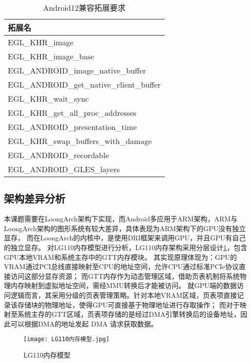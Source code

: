 \begin{table}[h]
  \centering
  \caption{Android12兼容拓展要求}
  \label{tab:Android12兼容拓展要求}
  \begin{tabular}{l}
    \toprule
    拓展名  \\
    \midrule
    EGL\_KHR\_image \\
    EGL\_KHR\_image\_base \\
    EGL\_ANDROID\_image\_native\_buffer \\
    EGL\_ANDROID\_get\_native\_client\_buffer \\
    EGL\_KHR\_wait\_sync \\
    EGL\_KHR\_get\_all\_proc\_addresses \\
    EGL\_ANDROID\_presentation\_time \\
    EGL\_KHR\_swap\_buffers\_with\_damage \\
    EGL\_ANDROID\_recordable \\
    EGL\_ANDROID\_GLES\_layers \\
    \bottomrule
  \end{tabular}
  \note{}
\end{table}

\subsection{架构差异分析}
\label{sec:架构差异分析}
本课题需要在LoongArch架构下实现，而Android多应用于ARM架构，ARM与LoongArch架构的图形系统有较大差异，具体表现为ARM架构下的GPU没有独立显存\cite{Inki}，
而在LoongArch的内核中，是使用DRI框架来调用GPU，并且GPU有自己的独立显存。
对LG110内存模型进行分析，LG110内存架构采用分层设计\ref{fig:LG110内存模型}，包含GPU本地VRAM和系统主存中的GTT内存模块。
其实现原理体现为：GPU的VRAM通过PCI总线直接映射至CPU的地址空间，允许CPU通过标准PCIe协议直接访问这部分显存资源；
而GTT内存作为动态管理区域，借助页表机制将系统物理内存映射到虚拟地址空间，需经MMU转换后才能被访问。
就GPU端的数据访问逻辑而言，其采用分级的页表管理策略。针对本地VRAM区域，页表项直接记录该存储块的物理地址，使得GPU可直接基于物理地址进行存取操作；
而对于映射至系统主存的GTT区域，页表项存储的是经过DMA引擎转换后的设备地址，因此可以根据DMA的地址发起 DMA 请求获取数据。

\begin{figure}
  \centering
  \texttt{[image: LG110内存模型.jpg]}
  \caption{LG110内存模型}
  \label{fig:LG110内存模型}
\end{figure}

